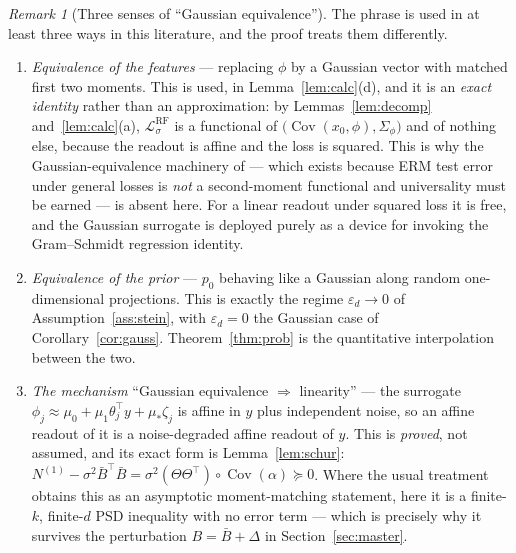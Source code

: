 \documentclass[11pt]{article}
\theoremstyle{remark}
\newtheorem{remark}{Remark}
\newcommand{\Cov}{\operatorname{Cov}}
\begin{document}
\begin{remark}[Three senses of ``Gaussian equivalence'']\label{rem:three-senses}
The phrase is used in at least three ways in this literature, and the proof treats them differently.
\begin{enumerate}
\item[(i)] \emph{Equivalence of the features} --- replacing $\phi$ by a Gaussian vector with matched first two moments. This is used, in Lemma~\ref{lem:calc}(d), and it is an \emph{exact identity} rather than an approximation: by Lemmas~\ref{lem:decomp} and~\ref{lem:calc}(a), $\mathcal L^{\mathrm{RF}}_\sigma$ is a functional of $\big(\Cov(x_0,\phi), \Sigma_\phi\big)$ and of nothing else, because the readout is affine and the loss is squared. This is why the Gaussian-equivalence machinery of \cite{HuLu22,MS22} --- which exists because ERM test error under general losses is \emph{not} a second-moment functional and universality must be earned --- is absent here. For a linear readout under squared loss it is free, and the Gaussian surrogate is deployed purely as a device for invoking the Gram--Schmidt regression identity.
\item[(ii)] \emph{Equivalence of the prior} --- $p_0$ behaving like a Gaussian along random one-dimensional projections. This is exactly the regime $\varepsilon_d \to 0$ of Assumption~\ref{ass:stein}, with $\varepsilon_d = 0$ the Gaussian case of Corollary~\ref{cor:gauss}. Theorem~\ref{thm:prob} is the quantitative interpolation between the two.
\item[(iii)] \emph{The mechanism} ``Gaussian equivalence $\Rightarrow$ linearity'' --- the surrogate $\phi_j \approx \mu_0 + \mu_1\theta_j^\top y + \mu_*\zeta_j$ is affine in $y$ plus independent noise, so an affine readout of it is a noise-degraded affine readout of $y$. This is \emph{proved}, not assumed, and its exact form is Lemma~\ref{lem:schur}: $N^{(1)} - \sigma^2\bar B^\top\bar B = \sigma^2(\Theta\Theta^\top)\circ\Cov(\alpha) \succeq 0$. Where the usual treatment obtains this as an asymptotic moment-matching statement, here it is a finite-$k$, finite-$d$ PSD inequality with no error term --- which is precisely why it survives the perturbation $B = \bar B + \Delta$ in Section~\ref{sec:master}.
\end{enumerate}
\end{remark}
\end{document}
